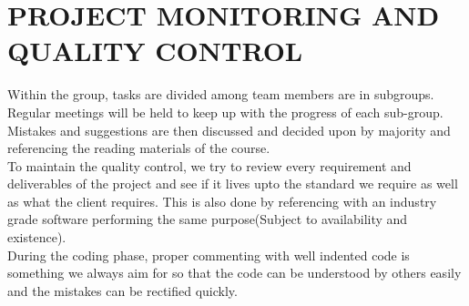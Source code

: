 \documentclass[
10pt, %
a4paper, %
oneside, %
headinclude,footinclude, %
BCOR5mm, %
]{scrartcl}
\begin{document}
\section{PROJECT MONITORING AND QUALITY CONTROL}
Within the group, tasks are divided among team members are in subgroups. Regular meetings will be held to keep up with the progress of each sub-group. Mistakes and suggestions are then discussed and decided upon by majority and referencing the reading materials of the course.
\vspace{0.5cm}
\\To maintain the quality control, we try to review every requirement and deliverables of the project and see if it lives upto the standard we require as well as what the client requires. This is also done by referencing with an industry grade software performing the same purpose(Subject to availability and existence).\vspace{0.5cm}
\\During the coding phase, proper commenting with well indented code is something we always aim for so that the code can be understood by others easily and the mistakes can be rectiﬁed quickly.
\end{document}
